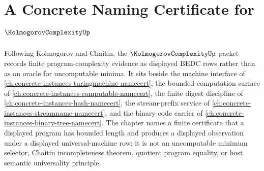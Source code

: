 \chapter{A Concrete Naming Certificate for $\KolmogorovComplexityUp$}
\label{ch:concrete-instances-kolmogorov-complexity-namecert}

Following Kolmogorov and Chaitin, the $\KolmogorovComplexityUp$ packet records finite program-complexity evidence as displayed BEDC rows rather than as an oracle for uncomputable minima. It sits beside the machine interface of \autoref{ch:concrete-instances-turingmachine-namecert}, the bounded-computation surface of \autoref{ch:concrete-instances-computable-namecert}, the finite digest discipline of \autoref{ch:concrete-instances-hash-namecert}, the stream-prefix service of \autoref{ch:concrete-instances-streamname-namecert}, and the binary-code carrier of \autoref{ch:concrete-instances-binary-tree-namecert}. The chapter names a finite certificate that a displayed program has bounded length and produces a displayed observation under a displayed universal-machine row; it is not an uncomputable minimum selector, Chaitin incompleteness theorem, quotient program equality, or host semantic universality principle.

